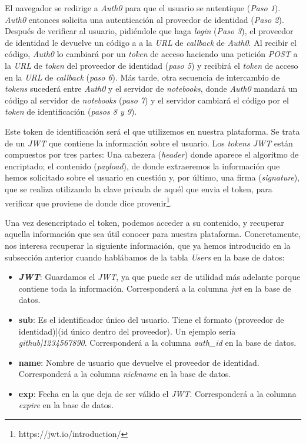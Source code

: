 \documentclass[11pt,spanish,listoffigures]{tfgetsinf}
\begin{document}
El navegador se redirige a \textit{Auth0} para que el usuario se autentique (\textit{Paso 1}). \textit{Auth0} entonces solicita una autenticación al proveedor de identidad (\textit{Paso 2}). Después de verificar al usuario, pidiéndole que haga \textit{login} (\textit{Paso 3}), el proveedor de identidad le devuelve un código a a la \textit{URL} de \textit{\gls{callback}} de \textit{Auth0}. Al recibir el código, \textit{Auth0} lo cambiará por un \textit{token} de acceso haciendo una petición \textit{POST} a la \textit{URL} de \textit{token} del proveedor de identidad (\textit{paso 5}) y recibirá el \textit{token} de acceso en la \textit{URL} de \textit{callback} (\textit{paso 6}). Más tarde, otra secuencia de intercambio de \textit{tokens} sucederá entre \textit{Auth0} y el servidor de \textit{notebooks}, donde \textit{Auth0} mandará un código al servidor de \textit{notebooks} (\textit{paso 7}) y el servidor cambiará el código por el \textit{token} de identificación (\textit{pasos 8 y 9}).

Este token de identificación será el que utilizemos en nuestra plataforma. Se trata de un \textit{JWT} que contiene la información sobre el usuario. Los \textit{tokens JWT} están compuestos por tres partes: Una cabezera (\textit{header}) donde aparece el algoritmo de encriptado; el contenido (\textit{payload}), de donde extraeremos la información que hemos solicitado sobre el usuario en cuestión y, por último, una firma (\textit{signature}), que se realiza utilizando la clave privada de aquél que envia el token, para verificar que proviene de donde dice provenir\footnote{https://jwt.io/introduction/}.

Una vez desencriptado el token, podemos acceder a su contenido, y recuperar aquella información que sea útil conocer para nuestra plataforma. Concretamente, nos interesa recuperar la siguiente información, que ya hemos introducido en la subsección anterior cuando hablábamos de la tabla \textit{Users} en la base de datos:

\begin{itemize}

\item \textbf{\textit{JWT}}: Guardamos el \textit{JWT}, ya que puede ser de utilidad más adelante porque contiene toda la información. Corresponderá a la columna \textit{jwt} en la base de datos.

\item \textbf{sub}: Es el identificador único del usuario. Tiene el formato (proveedor de identidad)|(id único dentro del proveedor). Un ejemplo sería \textit{github|1234567890}. Corresponderá a la columna \textit{auth\_id} en la base de datos.

\item \textbf{name}: Nombre de usuario que devuelve el proveedor de identidad. Corresponderá a la columna \textit{nickname} en la base de datos.

\item \textbf{exp}: Fecha en la que deja de ser válido el \textit{JWT}. Corresponderá a la columna \textit{expire} en la base de datos.

\end{itemize}
\end{document}
